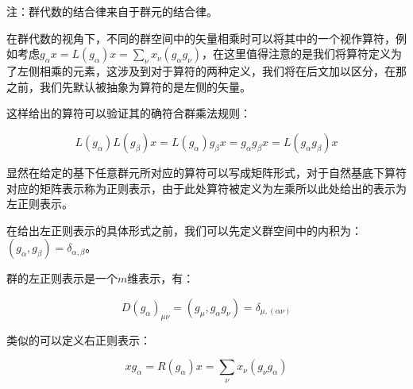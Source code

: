 注：群代数的结合律来自于群元的结合律。

在群代数的视角下，不同的群空间中的矢量相乘时可以将其中的一个视作算符，例如考虑$g_\alpha x=L(g_\alpha)x=\displaystyle\sum_\nu x_\nu (g_\alpha g_\nu)$，在这里值得注意的是我们将算符定义为了左侧相乘的元素，这涉及到对于算符的两种定义，我们将在后文加以区分，在那之前，我们先默认被抽象为算符的是左侧的矢量。

这样给出的算符可以验证其的确符合群乘法规则：

$$L(g_\alpha)L(g_\beta)x=L(g_\alpha)g_\beta x=g_\alpha g_\beta x=L(g_\alpha g_\beta)x$$

显然在给定的基下任意群元所对应的算符可以写成矩阵形式，对于自然基底下算符对应的矩阵表示称为正则表示，由于此处算符被定义为左乘所以此处给出的表示为左正则表示。

在给出左正则表示的具体形式之前，我们可以先定义群空间中的内积为：$(g_\alpha,g_\beta)=\delta_{\alpha,\beta}$。

群的左正则表示是一个$m$维表示，有：

$$D(g_\alpha)_{\mu\nu}=(g_\mu,g_\alpha g_\nu)=\delta_{\mu,(\alpha\nu)}$$

类似的可以定义右正则表示：

$$x g_\alpha=R(g_\alpha)x=\displaystyle\sum_\nu x_\nu (g_\nu g_\alpha)$$
